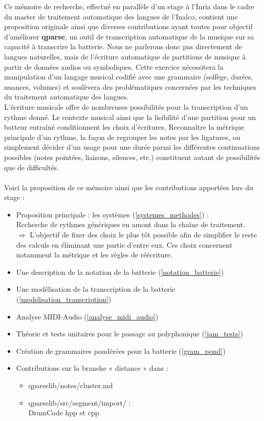 Ce mémoire de recherche, effectué en parallèle d’un stage à l’Inria dans le cadre du master de traitement automatique des langues de l’Inalco, contient une proposition originale ainsi que diverses contributions ayant toutes pour objectif d’améliorer \textbf{qparse}, un outil de transcription automatique de la musique sur sa capacité à transcrire la batterie. Nous ne parlerons donc pas directement de langues naturelles, mais de l’écriture automatique de partitions de musique à partir de données audios ou symboliques. Cette exercice nécessitera la manipulation d’un langage musical codifié avec une grammaire (solfège, durées, nuances, volumes) et soulèvera des problématiques concernées par les techniques du traitement automatique des langues.\\
L’écriture musicale offre de nombreuses possibilités pour la transcription d’un rythme donné. Le contexte musical ainsi que la lisibilité d’une partition pour un batteur entraîné conditionnent les choix d’écritures. Reconnaître la métrique principale d’un rythme, la façon de regrouper les notes par les ligatures, ou simplement décider d’un usage pour une durée parmi les différentes continuations possibles (notes pointées, liaisons, silences, etc.) constituent autant de possibilités que de difficultés.\\\\
Voici la proposition de ce mémoire ainsi que les contributions apportées lors du stage :
\begin{itemize}
	\item Proposition principale : les systèmes (\ref{systemes_methodes}) :\\
	Recherche de rythmes génériques en amont dans la chaîne de traitement.\\
	$\Rightarrow$ L’objectif de fixer des choix le plus tôt possible afin de simplifier le reste des calculs en éliminant une partie d’entre eux. Ces choix concernent notamment la métrique et les règles de réécriture.
	\item Une description de la notation de la batterie (\ref{notation_batterie})
	\item Une modélisation de la transcription de la batterie (\ref{modelisation_transcription})
	\item Analyse MIDI-Audio (\ref{analyse_midi_audio})
	\item Théorie et tests unitaires pour le passage au polyphonique (\ref{jam_tests})
	\item Création de grammaires pondérées pour la batterie (\ref{gram_pond})
	\item Contributions sur la branche « distance » dans :
	\begin{itemize}
		\item qparselib/notes/cluster.md
		\item qparselib/src/segment/import/ :\\
		DrumCode hpp et cpp\\
	\end{itemize}
\end{itemize}
 
